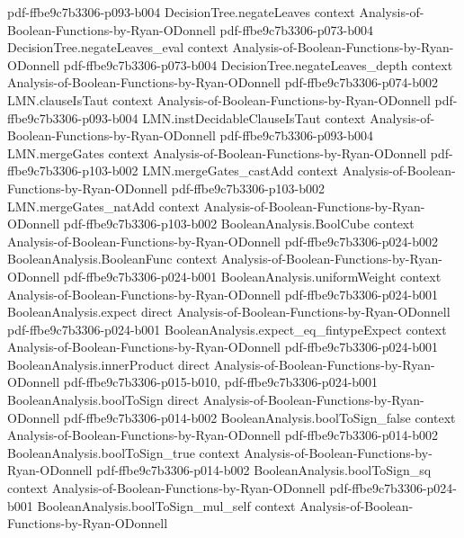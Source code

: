 \begin{lemma}
  {pdf-ffbe9c7b3306-p093-b004}
\proofstep
  {DecisionTree.negateLeaves}
  {context}
  {Analysis-of-Boolean-Functions-by-Ryan-ODonnell}
  {pdf-ffbe9c7b3306-p073-b004}
\proofstep
  {DecisionTree.negateLeaves_eval}
  {context}
  {Analysis-of-Boolean-Functions-by-Ryan-ODonnell}
  {pdf-ffbe9c7b3306-p073-b004}
\proofstep
  {DecisionTree.negateLeaves_depth}
  {context}
  {Analysis-of-Boolean-Functions-by-Ryan-ODonnell}
  {pdf-ffbe9c7b3306-p074-b002}
\proofstep
  {LMN.clauseIsTaut}
  {context}
  {Analysis-of-Boolean-Functions-by-Ryan-ODonnell}
  {pdf-ffbe9c7b3306-p093-b004}
\proofstep
  {LMN.instDecidableClauseIsTaut}
  {context}
  {Analysis-of-Boolean-Functions-by-Ryan-ODonnell}
  {pdf-ffbe9c7b3306-p093-b004}
\proofstep
  {LMN.mergeGates}
  {context}
  {Analysis-of-Boolean-Functions-by-Ryan-ODonnell}
  {pdf-ffbe9c7b3306-p103-b002}
\proofstep
  {LMN.mergeGates_castAdd}
  {context}
  {Analysis-of-Boolean-Functions-by-Ryan-ODonnell}
  {pdf-ffbe9c7b3306-p103-b002}
\proofstep
  {LMN.mergeGates_natAdd}
  {context}
  {Analysis-of-Boolean-Functions-by-Ryan-ODonnell}
  {pdf-ffbe9c7b3306-p103-b002}
\proofstep
  {BooleanAnalysis.BoolCube}
  {context}
  {Analysis-of-Boolean-Functions-by-Ryan-ODonnell}
  {pdf-ffbe9c7b3306-p024-b002}
\proofstep
  {BooleanAnalysis.BooleanFunc}
  {context}
  {Analysis-of-Boolean-Functions-by-Ryan-ODonnell}
  {pdf-ffbe9c7b3306-p024-b001}
\proofstep
  {BooleanAnalysis.uniformWeight}
  {context}
  {Analysis-of-Boolean-Functions-by-Ryan-ODonnell}
  {pdf-ffbe9c7b3306-p024-b001}
\proofstep
  {BooleanAnalysis.expect}
  {direct}
  {Analysis-of-Boolean-Functions-by-Ryan-ODonnell}
  {pdf-ffbe9c7b3306-p024-b001}
\proofstep
  {BooleanAnalysis.expect_eq_fintypeExpect}
  {context}
  {Analysis-of-Boolean-Functions-by-Ryan-ODonnell}
  {pdf-ffbe9c7b3306-p024-b001}
\proofstep
  {BooleanAnalysis.innerProduct}
  {direct}
  {Analysis-of-Boolean-Functions-by-Ryan-ODonnell}
  {pdf-ffbe9c7b3306-p015-b010,
    pdf-ffbe9c7b3306-p024-b001}
\proofstep
  {BooleanAnalysis.boolToSign}
  {direct}
  {Analysis-of-Boolean-Functions-by-Ryan-ODonnell}
  {pdf-ffbe9c7b3306-p014-b002}
\proofstep
  {BooleanAnalysis.boolToSign_false}
  {context}
  {Analysis-of-Boolean-Functions-by-Ryan-ODonnell}
  {pdf-ffbe9c7b3306-p014-b002}
\proofstep
  {BooleanAnalysis.boolToSign_true}
  {context}
  {Analysis-of-Boolean-Functions-by-Ryan-ODonnell}
  {pdf-ffbe9c7b3306-p014-b002}
\proofstep
  {BooleanAnalysis.boolToSign_sq}
  {context}
  {Analysis-of-Boolean-Functions-by-Ryan-ODonnell}
  {pdf-ffbe9c7b3306-p024-b001}
\proofstep
  {BooleanAnalysis.boolToSign_mul_self}
  {context}
  {Analysis-of-Boolean-Functions-by-Ryan-ODonnell}

\end{lemma}
